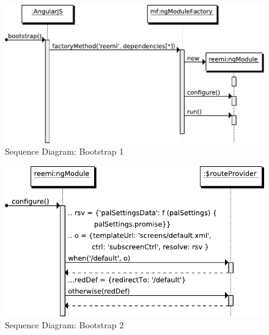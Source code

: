 \begin{figure}[htb]
    \centering
    \includegraphics{figures/design/seqdia/bootstrap-1.pdf}
    \caption{Sequence Diagram: Bootstrap 1}
    \label{fig:design-seqdia-bootstrap-1}
\end{figure}

\begin{figure}[htb]
    \centering
    \includegraphics{figures/design/seqdia/bootstrap-2.pdf}
    \caption{Sequence Diagram: Bootstrap 2}
    \label{fig:design-seqdia-bootstrap-2}
\end{figure}

